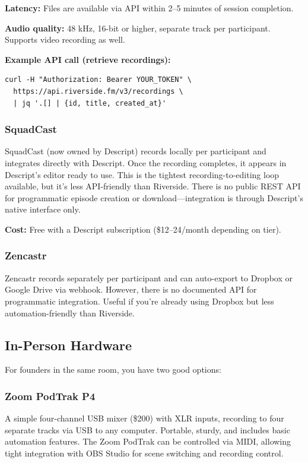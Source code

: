 \documentclass[11pt,letterpaper]{article}
\begin{document}
\textbf{Latency:} Files are available via API within 2–5 minutes of session completion.

\textbf{Audio quality:} 48 kHz, 16-bit or higher, separate track per participant. Supports video recording as well.

\textbf{Example API call (retrieve recordings):}
\begin{verbatim}
curl -H "Authorization: Bearer YOUR_TOKEN" \
  https://api.riverside.fm/v3/recordings \
  | jq '.[] | {id, title, created_at}'
\end{verbatim}

\subsubsection{SquadCast}

SquadCast (now owned by Descript) records locally per participant and integrates directly with Descript. Once the recording completes, it appears in Descript's editor ready to use. This is the tightest recording-to-editing loop available, but it's less API-friendly than Riverside. There is no public REST API for programmatic episode creation or download—integration is through Descript's native interface only.

\textbf{Cost:} Free with a Descript subscription (\$12–24/month depending on tier).

\subsubsection{Zencastr}

Zencastr records separately per participant and can auto-export to Dropbox or Google Drive via webhook. However, there is no documented API for programmatic integration. Useful if you're already using Dropbox but less automation-friendly than Riverside.

\subsection{In-Person Hardware}

For founders in the same room, you have two good options:

\subsubsection{Zoom PodTrak P4}

A simple four-channel USB mixer (\$200) with XLR inputs, recording to four separate tracks via USB to any computer. Portable, sturdy, and includes basic automation features. The Zoom PodTrak can be controlled via MIDI, allowing tight integration with OBS Studio for scene switching and recording control.
\end{document}
